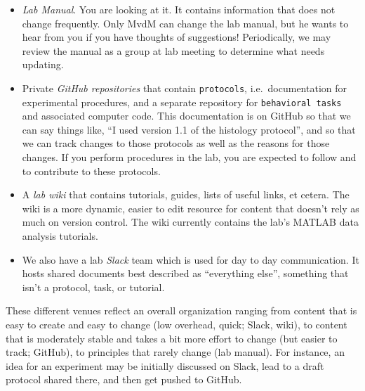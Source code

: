 \documentclass{tufte-book}
\newcommand{\doccls}[1]{\texttt{#1}}%
\begin{document}
\begin{itemize}
\item{{\it Lab Manual}. You are looking at it. It contains information
  that does not change frequently. Only MvdM can change the lab
  manual, but he wants to hear from you if you have thoughts of
  suggestions! Periodically, we may review the manual as a group at
  lab meeting to determine what needs updating.}
\item{Private {\it GitHub
    repositories} that contain \doccls{protocols},
  i.e.\ documentation for experimental procedures, and a separate repository for
  \doccls{behavioral tasks} and associated computer
  code. This documentation is on GitHub
  so that we can say things like, ``I used version 1.1 of the histology
  protocol'', and so that we can track changes to those protocols as
  well as the reasons for those changes. If you perform procedures in
  the lab, you are expected to follow and to contribute to these
  protocols.}
\item{A {\it lab
    wiki} that
  contains tutorials, guides, lists of useful links, et cetera. The
  wiki is a more dynamic, easier to edit resource for content that
  doesn't rely as much on version control. The wiki currently contains
  the lab's MATLAB data analysis tutorials.}
\item{We also have a lab {\it Slack}
  team which is used for day to day
  communication. It hosts shared documents best described as
  ``everything else'', something that isn't a protocol, task, or
  tutorial.}
\end{itemize}

These different venues reflect an overall organization ranging from
content that is easy to create and easy to change (low overhead,
quick; Slack, wiki), to content that is moderately stable and takes a
bit more effort to change (but easier to track; GitHub), to principles
that rarely change (lab manual). For instance, an idea for an
experiment may be initially discussed on Slack, lead to a draft
protocol shared there, and then get pushed to GitHub. 
\end{document}
